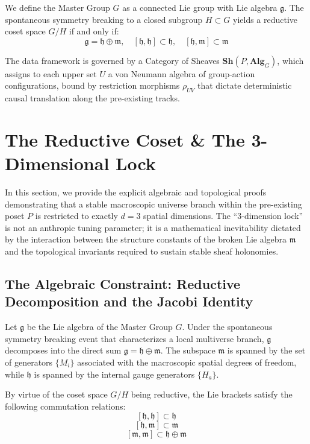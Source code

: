 \documentclass[12pt,letterpaper]{article}
\begin{document}
We define the Master Group $G$ as a connected Lie group with Lie algebra $\mathfrak{g}$. The spontaneous symmetry breaking to a closed subgroup $H \subset G$ yields a reductive coset space $G/H$ if and only if:
$$\mathfrak{g} = \mathfrak{h} \oplus \mathfrak{m}, \quad [\mathfrak{h}, \mathfrak{h}] \subset \mathfrak{h}, \quad [\mathfrak{h}, \mathfrak{m}] \subset \mathfrak{m}$$

The data framework is governed by a Category of Sheaves $\mathbf{Sh}(P, \mathbf{Alg}_G)$, which assigns to each upper set $U$ a von Neumann algebra of group-action configurations, bound by restriction morphisms $\rho_{UV}$ that dictate deterministic causal translation along the pre-existing tracks.

\section{The Reductive Coset \& The 3-Dimensional Lock}

In this section, we provide the explicit algebraic and topological proofs demonstrating that a stable macroscopic universe branch within the pre-existing poset $P$ is restricted to exactly $d=3$ spatial dimensions. The ``3-dimension lock'' is not an anthropic tuning parameter; it is a mathematical inevitability dictated by the interaction between the structure constants of the broken Lie algebra $\mathfrak{m}$ and the topological invariants required to sustain stable sheaf holonomies.

\subsection{The Algebraic Constraint: Reductive Decomposition and the Jacobi Identity}
Let $\mathfrak{g}$ be the Lie algebra of the Master Group $G$. Under the spontaneous symmetry breaking event that characterizes a local multiverse branch, $\mathfrak{g}$ decomposes into the direct sum $\mathfrak{g} = \mathfrak{h} \oplus \mathfrak{m}$. The subspace $\mathfrak{m}$ is spanned by the set of generators $\{M_i\}$ associated with the macroscopic spatial degrees of freedom, while $\mathfrak{h}$ is spanned by the internal gauge generators $\{H_a\}$.

By virtue of the coset space $G/H$ being reductive, the Lie brackets satisfy the following commutation relations:
$$[\mathfrak{h}, \mathfrak{h}] \subset \mathfrak{h}$$
$$[\mathfrak{h}, \mathfrak{m}] \subset \mathfrak{m}$$
$$[\mathfrak{m}, \mathfrak{m}] \subset \mathfrak{h} \oplus \mathfrak{m}$$
\end{document}
